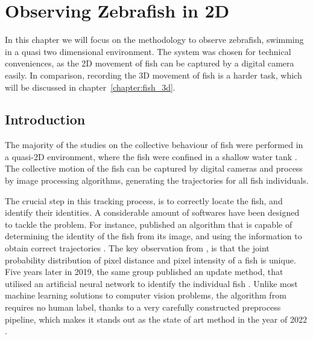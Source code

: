 \documentclass[11pt,twoside]{report}
\begin{document}
\chapter{Observing Zebrafish in 2D}
\label{chapter:fish_2d}




In this chapter we will focus on the methodology to observe zebrafish, swimming in a quasi two dimensional environment. The system was chosen for technical conveniences, as the 2D movement of fish can be captured by a digital camera easily. In comparison, recording the 3D movement of fish is a harder task, which will be discussed in chapter~\ref{chapter:fish_3d}. %


\section{Introduction}


The majority of the studies on the collective behaviour of fish were performed in a quasi-2D environment, where the fish were confined in a shallow water tank \cite{miller2007, strandburg-peshkin2013, heras2019, sridhar2021}. The collective motion of the fish can be captured by digital cameras and process by image processing algorithms, generating the trajectories for all fish individuals.

The crucial step in this tracking process, is to correctly locate the fish, and identify their identities. A considerable amount of softwares have been designed to tackle the problem. For instance, \citeauthor{perez-escudero2014} published an algorithm that is capable of determining the identity of the fish from its image, and using the information to obtain correct trajectories \cite{perez-escudero2014}.
The key observation from \citeauthor{perez-escudero2014}, is that the joint probability distribution of pixel distance and pixel intensity of a fish is unique. Five years later in 2019, the same group published an update method, that utilised an artificial neural network to identify the individual fish \cite{romero-ferrero2019}.
Unlike most machine learning solutions to computer vision problems, the algorithm from \citeauthor{romero-ferrero2019} requires no human label, thanks to a very carefully constructed preprocess pipeline, which makes it stands out as the state of art method in the year of 2022 \cite{walter2021}.
\end{document}
